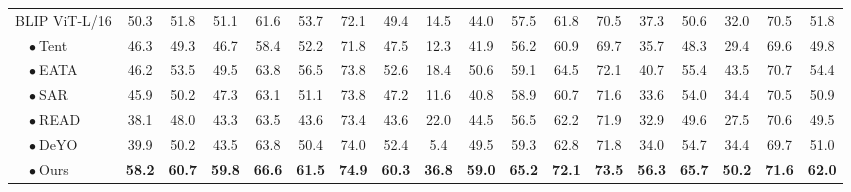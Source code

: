 \documentclass[11pt]{article}
\theoremstyle{plain}
\theoremstyle{definition}
\theoremstyle{remark}
\begin{document}
\begin{table}[h!]
\begin{center}
\begin{threeparttable}
{\begin{tabular}{l|cccc|cccc|cccc|cccc|>{\columncolor{blue!8}}c}
    \cmidrule{1-18}
        BLIP ViT-L/16 & 50.3 & 51.8 & 51.1 & 61.6 & 53.7 & 72.1 & 49.4 & 14.5 & 44.0 & 57.5 & 61.8 & 70.5 & 37.3 & 50.6 & 32.0 & 70.5 & 51.8 \\ 
        ~~$\bullet~$Tent & 46.3 & 49.3 & 46.7 & 58.4 & 52.2 & 71.8 & 47.5 & 12.3 & 41.9 & 56.2 & 60.9 & 69.7 & 35.7 & 48.3 & 29.4 & 69.6 & 49.8  \\ %
        ~~$\bullet~$EATA & 46.2 & 53.5 & 49.5 & 63.8 & 56.5 & 73.8 & 52.6 & 18.4 & 50.6 & 59.1 & 64.5 & 72.1 & 40.7 & 55.4 & 43.5 & 70.7 & 54.4 \\
        ~~$\bullet~$SAR & 45.9 & 50.2 & 47.3 & 63.1 & 51.1 & 73.8 & 47.2 & 11.6 & 40.8 & 58.9 & 60.7 & 71.6 & 33.6 & 54.0 & 34.4 & 70.5 & 50.9  \\
        ~~$\bullet~$READ & 38.1 & 48.0 & 43.3 & 63.5 & 43.6 & 73.4 & 43.6 & 22.0 & 44.5 & 56.5 & 62.2 & 71.9 & 32.9 & 49.6 & 27.5 & 70.6 & 49.5 \\
        ~~$\bullet~$DeYO & 39.9 & 50.2 & 43.5 & 63.8 & 50.4 & 74.0 & 52.4 & 5.4 & 49.5 & 59.3 & 62.8 & 71.8 & 34.0 & 54.7 & 34.4 & 69.7 & 51.0  \\
        \rowcolor{pink!30}~~$\bullet~$Ours & \textbf{58.2} & \textbf{60.7} & \textbf{59.8} & \textbf{66.6} & \textbf{61.5} & \textbf{74.9} & \textbf{60.3} & \textbf{36.8} & \textbf{59.0} & \textbf{65.2} & \textbf{72.1} & \textbf{73.5} & \textbf{56.3} & \textbf{65.7} & \textbf{50.2} & \textbf{71.6} & \textbf{62.0} \\
    \cmidrule{1-18}
	\end{tabular}
	}
	 \end{threeparttable}
	 \end{center}
\vspace{-0.2in}
\end{table}
\end{document}
